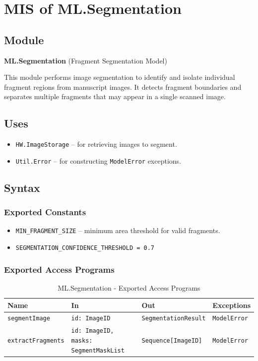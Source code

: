 \documentclass[12pt, titlepage]{article}
\begin{document}
\section{MIS of ML.Segmentation} \label{ML.Segmentation}

\subsection{Module}
\textbf{ML.Segmentation} \; (Fragment Segmentation Model)

This module performs image segmentation to identify and isolate individual fragment regions from manuscript images. It detects fragment boundaries and separates multiple fragments that may appear in a single scanned image.

\subsection{Uses}
\begin{itemize}
    \item \texttt{HW.ImageStorage} – for retrieving images to segment.
    \item \texttt{Util.Error} – for constructing \texttt{ModelError} exceptions.
\end{itemize}

\subsection{Syntax}

\subsubsection{Exported Constants}
\begin{itemize}
    \item \texttt{MIN\_FRAGMENT\_SIZE} – minimum area threshold for valid fragments.
    \item \texttt{SEGMENTATION\_CONFIDENCE\_THRESHOLD = 0.7}
\end{itemize}

\subsubsection{Exported Access Programs}

\begin{table}[H]
\centering
\small
\caption{ML.Segmentation - Exported Access Programs}
\begin{tabular}{p{3.5cm} p{3.5cm} p{3.5cm} p{3.5cm}}
\toprule
\textbf{Name} & \textbf{In} & \textbf{Out} & \textbf{Exceptions} \\
\midrule
\texttt{segmentImage} & \texttt{id: ImageID} & \texttt{SegmentationResult} & \texttt{ModelError} \\
\texttt{extractFragments} & \texttt{id: ImageID, masks: SegmentMaskList} & \texttt{Sequence[ImageID]} & \texttt{ModelError} \\
\bottomrule
\end{tabular}
\end{table}
\end{document}
